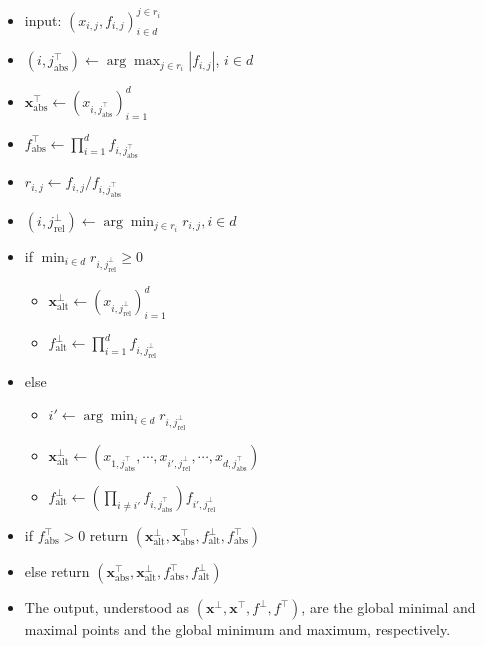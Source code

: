 \documentclass{article}
\begin{document}
\begin{itemize}

\item
  input: $(x_{i,j}, f_{i,j})_{i \in d}^{j \in r_i}$
\item
  $(i, j^\top_{\mathrm{abs}}) \gets \arg\max_{j \in r_i} |f_{i,j}|$,
  $i \in d$
\item
  $\mathbf{x}_{\mathrm{abs}}^\top \gets (x_{i, j^\top_{\mathrm{abs}}})_{i=1}^d$
\item
  $f_{\mathrm{abs}}^\top \gets \prod_{i=1}^d f_{i, j^\top_{\mathrm{abs}}}$
\item
  $r_{i,j} \gets f_{i,j} / f_{i, j^\top_{\mathrm{abs}}}$
\item
  $(i, j^\bot_{\mathrm{rel}}) \gets \arg\min_{j \in r_i} r_{i,j}, i \in d$
\item
  if $\min_{i \in d} r_{i, j^\bot_{\mathrm{rel}}} \ge 0$

  \begin{itemize}
  
  \item
    $\mathbf{x}_{\mathrm{alt}}^\bot \gets (x_{i, j^\bot_{\mathrm{rel}}})_{i=1}^d$
  \item
    $f_{\mathrm{alt}}^\bot \gets \prod_{i=1}^d f_{i, j^\bot_{\mathrm{rel}}}$
  \end{itemize}
\item
  else

  \begin{itemize}
  
  \item
    $i' \gets \arg\min_{i \in d} r_{i, j^\bot_{\mathrm{rel}}}$
  \item
    $\mathbf{x}_{\mathrm{alt}}^\bot \gets (x_{1, j^\top_{\mathrm{abs}}}, \cdots,  x_{i', j^\bot_{\mathrm{rel}}}, \cdots, x_{d, j^\top_{\mathrm{abs}}})$
  \item
    $f_{\mathrm{alt}}^\bot \gets (\prod_{i \ne i'} f_{i, j^\top_{\mathrm{abs}}})  f_{i', j^\bot_{\mathrm{rel}}}$
  \end{itemize}
\item
  if $f_{\mathrm{abs}}^\top > 0$ return
  $(\mathbf{x}_{\mathrm{alt}}^\bot, \mathbf{x}_{\mathrm{abs}}^\top, f_{\mathrm{alt}}^\bot, f_{\mathrm{abs}}^\top)$
\item
  else return
  $(\mathbf{x}_{\mathrm{abs}}^\top, \mathbf{x}_{\mathrm{alt}}^\bot, f_{\mathrm{abs}}^\top, f_{\mathrm{alt}}^\bot)$
\item
  The output, understood as
  $(\mathbf{x}^\bot, \mathbf{x}^\top, f^\bot, f^\top)$, are the global
  minimal and maximal points and the global minimum and maximum,
  respectively.
\end{itemize}
\end{document}
